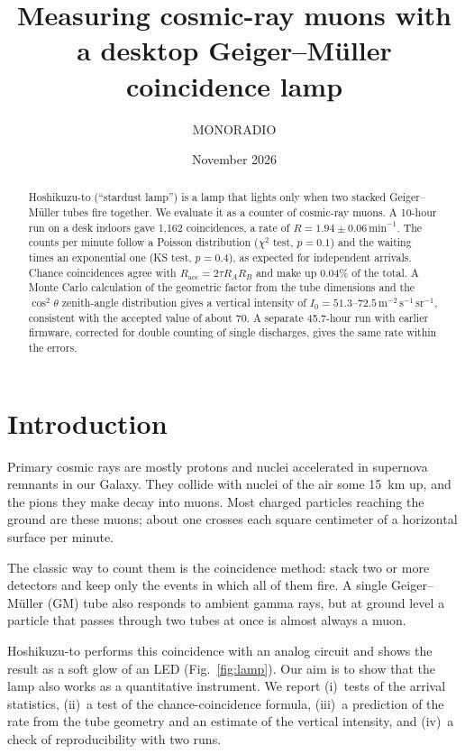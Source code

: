 \documentclass[aip,ajp,amsmath,amssymb,reprint]{revtex4-2}
\newcommand{\permin}{\,\mathrm{min}^{-1}}
\newcommand{\Iunit}{\,\mathrm{m^{-2}\,s^{-1}\,sr^{-1}}}
\begin{document}
\title{Measuring cosmic-ray muons with a desktop Geiger--M\"uller coincidence lamp}
\author{MONORADIO}
\date{November 2026}

\begin{abstract}
Hoshikuzu-to (``stardust lamp'') is a lamp that lights only when two stacked Geiger--M\"uller tubes fire together. We evaluate it as a counter of cosmic-ray muons. A 10-hour run on a desk indoors gave 1,162 coincidences, a rate of $R = 1.94 \pm 0.06\permin$. The counts per minute follow a Poisson distribution ($\chi^2$ test, $p = 0.1$) and the waiting times an exponential one (KS test, $p = 0.4$), as expected for independent arrivals. Chance coincidences agree with $R_\mathrm{acc} = 2\tau R_A R_B$ and make up 0.04\% of the total. A Monte Carlo calculation of the geometric factor from the tube dimensions and the $\cos^2\theta$ zenith-angle distribution gives a vertical intensity of $I_0 = 51.3$--$72.5\Iunit$, consistent with the accepted value of about 70. A separate 45.7-hour run with earlier firmware, corrected for double counting of single discharges, gives the same rate within the errors.
\end{abstract}

\maketitle

\section{Introduction}

Primary cosmic rays are mostly protons and nuclei accelerated in supernova remnants in our Galaxy. They collide with nuclei of the air some 15~km up, and the pions they make decay into muons. Most charged particles reaching the ground are these muons; about one crosses each square centimeter of a horizontal surface per minute.\cite{pdg}

The classic way to count them is the coincidence method: stack two or more detectors and keep only the events in which all of them fire. A single Geiger--M\"uller (GM) tube also responds to ambient gamma rays, but at ground level a particle that passes through two tubes at once is almost always a muon.

Hoshikuzu-to performs this coincidence with an analog circuit and shows the result as a soft glow of an LED (Fig.~\ref{fig:lamp}). Our aim is to show that the lamp also works as a quantitative instrument. We report (i)~tests of the arrival statistics, (ii)~a test of the chance-coincidence formula, (iii)~a prediction of the rate from the tube geometry and an estimate of the vertical intensity, and (iv)~a check of reproducibility with two runs.
\end{document}
